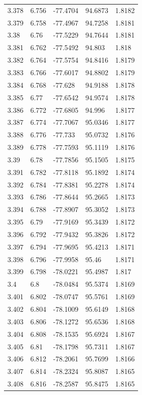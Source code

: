 \begin{tabular}{lllll}
3.378 & 6.756 & -77.4704 & 94.6873 & 1.8182 \\
3.379 & 6.758 & -77.4967 & 94.7258 & 1.8181 \\
3.38 & 6.76 & -77.5229 & 94.7644 & 1.8181 \\
3.381 & 6.762 & -77.5492 & 94.803 & 1.818 \\
3.382 & 6.764 & -77.5754 & 94.8416 & 1.8179 \\
3.383 & 6.766 & -77.6017 & 94.8802 & 1.8179 \\
3.384 & 6.768 & -77.628 & 94.9188 & 1.8178 \\
3.385 & 6.77 & -77.6542 & 94.9574 & 1.8178 \\
3.386 & 6.772 & -77.6805 & 94.996 & 1.8177 \\
3.387 & 6.774 & -77.7067 & 95.0346 & 1.8177 \\
3.388 & 6.776 & -77.733 & 95.0732 & 1.8176 \\
3.389 & 6.778 & -77.7593 & 95.1119 & 1.8176 \\
3.39 & 6.78 & -77.7856 & 95.1505 & 1.8175 \\
3.391 & 6.782 & -77.8118 & 95.1892 & 1.8174 \\
3.392 & 6.784 & -77.8381 & 95.2278 & 1.8174 \\
3.393 & 6.786 & -77.8644 & 95.2665 & 1.8173 \\
3.394 & 6.788 & -77.8907 & 95.3052 & 1.8173 \\
3.395 & 6.79 & -77.9169 & 95.3439 & 1.8172 \\
3.396 & 6.792 & -77.9432 & 95.3826 & 1.8172 \\
3.397 & 6.794 & -77.9695 & 95.4213 & 1.8171 \\
3.398 & 6.796 & -77.9958 & 95.46 & 1.8171 \\
3.399 & 6.798 & -78.0221 & 95.4987 & 1.817 \\
3.4 & 6.8 & -78.0484 & 95.5374 & 1.8169 \\
3.401 & 6.802 & -78.0747 & 95.5761 & 1.8169 \\
3.402 & 6.804 & -78.1009 & 95.6149 & 1.8168 \\
3.403 & 6.806 & -78.1272 & 95.6536 & 1.8168 \\
3.404 & 6.808 & -78.1535 & 95.6924 & 1.8167 \\
3.405 & 6.81 & -78.1798 & 95.7311 & 1.8167 \\
3.406 & 6.812 & -78.2061 & 95.7699 & 1.8166 \\
3.407 & 6.814 & -78.2324 & 95.8087 & 1.8165 \\
3.408 & 6.816 & -78.2587 & 95.8475 & 1.8165 \\

\end{tabular}
